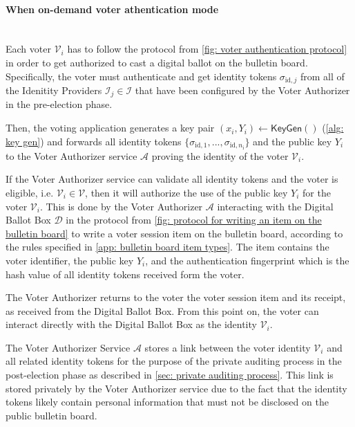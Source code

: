 \paragraph{When on-demand voter athentication mode}\mbox{}\\
Each voter $\mathcal{V}_i$ has to follow the protocol from \cref{fig: voter authentication protocol} in order to get authorized to cast a digital ballot on the bulletin board. Specifically, the voter must authenticate and get identity tokens $\sigma_{\mathrm{id}, j}$ from all of the Idenitity Providers $\mathcal{I}_j \in \boldsymbol{\mathcal{I}}$ that have been configured by the Voter Authorizer in the pre-election phase.

Then, the voting application generates a key pair $(x_i, Y_i) \gets \mathsf{KeyGen}()$ (\cref{alg: key gen}) and forwards all identity tokens $\{ \sigma_{\mathrm{id}, 1}, ..., \sigma_{\mathrm{id}, n_\mathrm{i}} \}$ and the public key $Y_i$ to the Voter Authorizer service $\mathcal{A}$ proving the identity of the voter $\mathcal{V}_i$.

If the Voter Authorizer service can validate all identity tokens and the voter is eligible, i.e. $\mathcal{V}_i \in \boldsymbol{\mathcal{V}}$, then it will authorize the use of the public key $Y_i$ for the voter $\mathcal{V}_i$. This is done by the Voter Authorizer $\mathcal{A}$ interacting with the Digital Ballot Box $\mathcal{D}$ in the protocol from \cref{fig: protocol for writing an item on the bulletin board} to write a voter session item on the bulletin board, according to the rules specified in \cref{app: bulletin board item types}. The item contains the voter identifier, the public key $Y_i$, and the authentication fingerprint which is the hash value of all identity tokens received form the voter.

The Voter Authorizer returns to the voter the voter session item and its receipt, as received from the Digital Ballot Box. From this point on, the voter can interact directly with the Digital Ballot Box as the identity $\mathcal{V}_i$.

The Voter Authorizer Service $\mathcal{A}$ stores a link between the voter identity $\mathcal{V}_i$ and all related identity tokens for the purpose of the private auditing process in the post-election phase as described in \cref{sec: private auditing process}. This link is stored privately by the Voter Authorizer service due to the fact that the identity tokens likely contain personal information that must not be disclosed on the public bulletin board.

